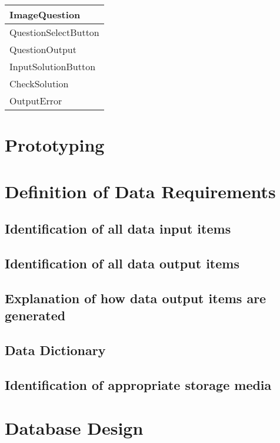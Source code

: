 \begin{center}
\begin{tabular}{|p{5cm}|} \hline
ImageQuestion \\ \hline
QuestionSelectButton \\ 
QuestionOutput \\ \hline
InputSolutionButton \\ 
CheckSolution \\
OutputError \\ \hline
\end{tabular}
\end{center}

\section{Prototyping}

\section{Definition of Data Requirements}

\subsection{Identification of all data input items}

\subsection{Identification of all data output items}

\subsection{Explanation of how data output items are generated}

\subsection{Data Dictionary}

\subsection{Identification of appropriate storage media}

\section{Database Design}

